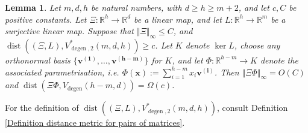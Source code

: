 \documentclass[12pt,a4paper,twoside,reqno]{amsart}
\newtheorem{Lemma}[Theorem]{Lemma}
\newcommand{\degen}{\operatorname{degen}}
\numberwithin{equation}{section}
\begin{document}
\begin{Lemma}
\label{Quantitative orthonormal basis parametrisation}
Let $m,d,h$ be natural numbers, with $d\geqslant h\geqslant m+2$, and let $c,C$ be positive constants. Let $\Xi:\mathbb{R}^h \longrightarrow \mathbb{R}^d$ be a linear map, and let $L:\mathbb{R}^h \longrightarrow \mathbb{R}^m$ be a surjective linear map. Suppose that $\Vert \Xi\Vert_\infty \leqslant C$, and $\operatorname{dist}((\Xi,L),V^*_{\degen,2}(m,d,h))\geqslant c$. Let $K$ denote $\ker L$, choose any orthonormal basis $\{\mathbf{v^{(1)}},\dots, \mathbf{v^{(h-m)}}\}$ for $K$, and let $\Phi:\mathbb{R}^{h-m}\longrightarrow K$ denote the associated parametrisation, i.e. $\Phi(\mathbf{x}) := \sum_{i=1}^{h-m}x_i\mathbf{v^{(i)}}$. Then $\Vert \Xi  \Phi\Vert_{\infty} = O(C)$ and $\operatorname{dist}(\Xi\Phi, V_{\degen}(h-m,d)) = \Omega(c)$.  
\end{Lemma}
\noindent For the definition of $\operatorname{dist}((\Xi,L),V^*_{\degen,2}(m,d,h))$, consult Definition \ref{Definition distance metric for pairs of matrices}.
\end{document}
